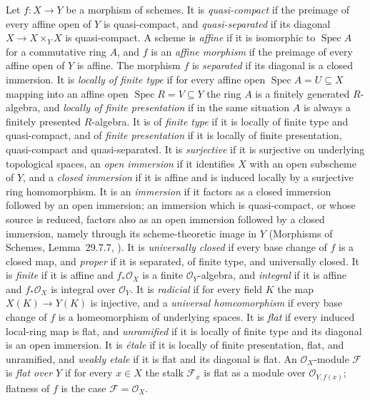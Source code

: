\begin{definition}
\label{def:pcb-scheme-conventions}
Let \(f:X\to Y\) be a morphism of schemes.  It is \emph{quasi-compact} if
the preimage of every affine open of \(Y\) is quasi-compact, and
\emph{quasi-separated} if its diagonal \(X\to X\times_YX\) is
quasi-compact.  A scheme is \emph{affine} if it is isomorphic to
\(\operatorname{Spec}A\) for a commutative ring \(A\), and \(f\) is an
\emph{affine morphism} if the preimage of every affine open of \(Y\) is
affine.  The morphism \(f\) is \emph{separated} if its diagonal is a
closed immersion.  It is \emph{locally of finite type} if for every affine open
\(\operatorname{Spec}A=U\subseteq X\) mapping into an affine open
\(\operatorname{Spec}R=V\subseteq Y\) the ring \(A\) is a finitely
generated \(R\)-algebra, and \emph{locally of finite presentation} if in
the same situation \(A\) is always a finitely presented \(R\)-algebra.
It is of \emph{finite type} if it is locally of finite type and
quasi-compact, and of \emph{finite presentation} if it is locally of
finite presentation, quasi-compact and quasi-separated.  It is
\emph{surjective} if it is surjective on underlying topological spaces,
an \emph{open immersion} if it identifies \(X\) with an open subscheme
of \(Y\), and a \emph{closed
immersion} if it is affine and is induced locally by a surjective ring
homomorphism.  It is an \emph{immersion} if it factors as a closed
immersion followed by an open immersion; an immersion which is
quasi-compact, or whose source is reduced, factors also as an open
immersion followed by a closed immersion, namely through its
scheme-theoretic image in \(Y\) (Morphisms of Schemes, Lemma~29.7.7,
).  It is \emph{universally closed} if every base change of
\(f\) is a closed map, and \emph{proper} if it is separated, of finite
type, and universally closed.  It is \emph{finite} if it is affine and
\(f_*\mathcal O_X\) is a finite \(\mathcal O_Y\)-algebra, and
\emph{integral} if it is affine and \(f_*\mathcal O_X\) is integral over
\(\mathcal O_Y\).  It is \emph{radicial} if for every field \(K\) the
map \(X(K)\to Y(K)\) is injective, and a \emph{universal homeomorphism}
if every base change of \(f\) is a homeomorphism of underlying spaces.
It is \emph{flat} if every induced local-ring map is flat, and
\emph{unramified} if it is locally of finite type and its diagonal is an
open immersion.  It is \emph{\'etale} if it is locally of finite
presentation, flat, and unramified, and \emph{weakly etale} if it is
flat and its diagonal is flat.  An \(\mathcal O_X\)-module
\(\mathcal F\) is \emph{flat over \(Y\)} if for every \(x\in X\) the
stalk \(\mathcal F_x\) is flat as a module over
\(\mathcal O_{Y,f(x)}\); flatness of \(f\) is the case
\(\mathcal F=\mathcal O_X\).


\end{definition}
